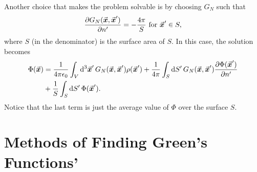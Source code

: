 Another choice that makes the problem solvable is by choosing $G_{N}$ such that
\begin{align}
    \pdv{G_{N}(\va*{x},\va*{x}')}{n'} = -\frac{4 \pi}{S} ~{\rm for}~\va*{x}' \in S
,\end{align}
where $S$ (in the denominator) is the surface area of $S$.
In this case, the solution becomes
\begin{align}
    \Phi(\va*{x}) &= \frac{1}{4 \pi \epsilon_0} \int_{V} \dd[3]{\va*{x}'} G_{N}(\va*{x},\va*{x}') \rho(\va*{x}') + \frac{1}{4 \pi} \int_{S} \dd{S'} G_{N}(\va*{x},\va*{x}') \pdv{\Phi(\va*{x}')}{n'} \\
                  &+ \frac{1}{S} \int_{S} \dd{S'} \Phi(\va*{x}')
.\end{align}
Notice that the last term is just the average value of $\Phi$ over the surface $S$.

\section{Methods of Finding Green's Functions'}





